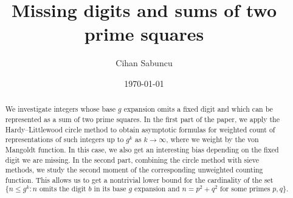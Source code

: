\documentclass[12pt]{amsart}
\theoremstyle{definition}
\theoremstyle{definition}
\theoremstyle{remark}
\numberwithin{equation}{section}
\renewcommand{\leq}{\leqslant}
\begin{document}





\title[Missing digits and sums of two prime squares]{Missing digits and sums of two prime squares}

\author{Cihan Sabuncu}

\address{Max Planck Institute for Mathematics \\
Vivatsgasse 7 \\
53111 Bonn \\
Germany}



\subjclass[2010]{}

\date{\today}

\begin{abstract}
We investigate integers whose base $g$ expansion omits a fixed digit and which can be represented as a sum of two prime squares. In the first part of the paper, we apply the Hardy--Littlewood circle method to obtain asymptotic formulas for weighted count of representations of such integers up to $g^k$ as $k\to\infty$, where we weight by the von Mangoldt function. In this case, we also get an interesting bias depending on the fixed digit we are missing. In the second part, combining the circle method with sieve methods, we study the second moment of the corresponding unweighted counting function. This allows us to get a nontrivial lower bound for the cardinality of the set
$$\{ n \leq g^k : n \text{ omits the digit } b \text{ in its base } g \text{ expansion and } n = p^2 + q^2 \text{ for some primes } p,q \}. $$
\end{abstract}

\maketitle
\end{document}
